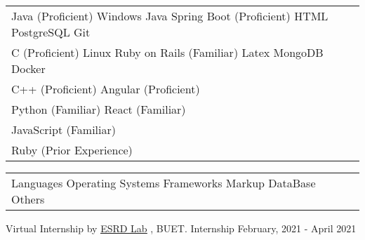 \documentclass[]{awesome-cv}
\begin{document}
\begin{cventries}
	\cventry
	{\def\arraystretch{1.15}{\begin{tabular}{ l l }
				Java (Proficient) \hspace{1.2cm} Windows \hspace{1.6cm}  Java Spring Boot (Proficient) \hspace{1cm} HTML \hspace{1.2cm} PostgreSQL \hspace{1.4cm} Git  & {\skill{ }} \\
				C (Proficient) \hspace{1.6cm} Linux \hspace{2.4cm} Ruby on Rails (Familiar)  \hspace{1.3cm} Latex \hspace{1.4cm} MongoDB \hspace{1.4cm} Docker & {\skill{ }} \\
				C++ (Proficient) \hspace{4.7cm} Angular (Proficient) \hspace{1.4cm}   & {\skill{ }} \\
				Python (Familiar) \hspace{4.7cm} React (Familiar) \hspace{2cm}   & {\skill{ }} \\
				JavaScript (Familiar)  & {\skill{ }} \\
				Ruby (Prior Experience)  & {\skill{ }} \\
	\end{tabular}}}
	{\def\arraystretch{1.15}{\begin{tabular}{ l l }
		Languages \hspace{1cm} Operating Systems \hspace{1.2cm} Frameworks \hspace{1.5cm} Markup \hspace{1cm} DataBase \hspace{1cm} Others  & {\skill{ }} \\
		\end{tabular}}}
	{}
	{}
	{}
	
\end{cventries}

\vspace{-7mm}


\begin{cventries}
	\cventry
	{Virtual Internship by \href{http://esrdlab.cse.buet.ac.bd/esrdlab/}{\underline{ESRD Lab}} , BUET.}
	{Internship}
	{}
	{February, 2021 - April 2021}
	{}
\end{cventries}
\end{document}
